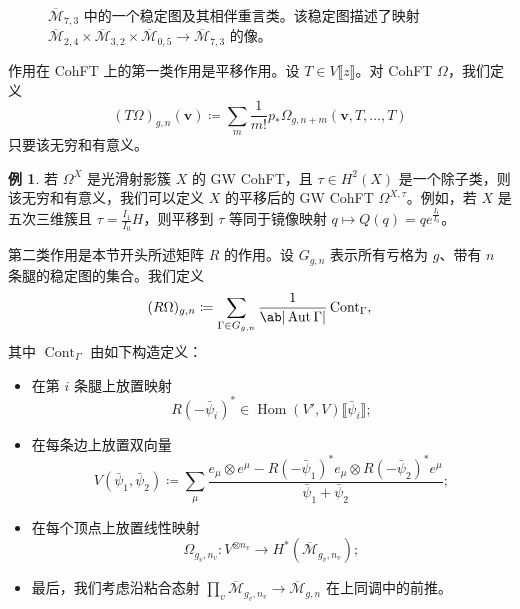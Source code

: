 \documentclass{amsart}
\theoremstyle{definition}
\newtheorem{exm}[thm]{例}
\theoremstyle{remark}
\theoremstyle{plain}
\theoremstyle{definition}
\theoremstyle{remark}
\newcommand{\Mbar}{\overline{\mathcal{M}}}
\newcommand{\mc}[1]{\mathcal{#1}}
\newcommand{\mbf}[1]{\mathbf{#1}}
\newcommand{\bv}{\mbf{v}}
\newcommand{\on}[1]{\operatorname{#1}}
\newcommand{\ol}[1]{\overline{#1}}
\newcommand{\1}{\mathbf{1}}
\newcommand{\2}{\mathbf{2}}
\newcommand{\3}{\mathbf{3}}
\newcommand{\ps}[1]{\llbracket #1 \rrbracket}
\DeclareMathOperator{\Hom}{Hom}
\DeclareMathOperator{\Aut}{Aut}
\begin{document}
\begin{figure}[htpb]
  \centering
  \caption{$\ol{\mc{M}}_{7,3}$ 中的一个稳定图及其相伴重言类。该稳定图描述了映射
    $\ol{\mc{M}}_{2,4} \times \ol{\mc{M}}_{3,2} \times \ol{\mc{M}}_{0,5} \to \ol{\mc{M}}_{7,3}$ 的像。}
  \label{fig:stablegraph}
\end{figure}

作用在 CohFT 上的第一类作用是平移作用。设 $T \in V\ps{z}$。对 CohFT $\Omega$，我们定义
\[ (T\Omega)_{g,n}(\bv) \coloneqq \sum_m \frac{1}{m!} p_* \Omega_{g,n+m}(\bv, T,\ldots,T) \]
只要该无穷和有意义。

\begin{exm}
    若 $\Omega^X$ 是光滑射影簇 $X$ 的 GW CohFT，且 $\tau \in H^2(X)$ 是一个除子类，则该无穷和有意义，我们可以定义 $X$ 的平移后的 GW CohFT $\Omega^{X,\tau}$。例如，若 $X$ 是五次三维簇且 $\tau = \frac{I_1}{I_0} H$，则平移到 $\tau$ 等同于镜像映射 $q \mapsto Q(q) = q e^{\frac{I_1}{I_0}}$。
\end{exm}

第二类作用是本节开头所述矩阵 $R$ 的作用。设 $G_{g,n}$ 表示所有亏格为 $g$、带有 $n$ 条腿的稳定图的集合。我们定义
\[ (R\Omega)_{g,n} \coloneqq \sum_{\Gamma \in G_{g,n}} \frac{1}{\ab|\Aut \Gamma|} \on{Cont}_{\Gamma}, \]
其中 $\on{Cont}_{\Gamma}$ 由如下构造定义：
\begin{itemize}
    \item 在第 $i$ 条腿上放置映射 
        \[ R(-\bar{\psi}_i)^* \in \Hom(V',V) \ps{\bar{\psi}_i}; \]
    \item 在每条边上放置双向量
        \[ V(\bar{\psi}_1, \bar{\psi}_2) \coloneqq \sum_{\mu} \frac{e_{\mu} \otimes e^{\mu} - R(-\bar{\psi}_1)^* e_{\mu} \otimes R(-\bar{\psi}_2)^* e^{\mu}}{\bar{\psi}_1 + \bar{\psi}_2}; \]
    \item 在每个顶点上放置线性映射
        \[ \Omega_{g_v, n_v} \colon V^{\otimes n_v} \to H^*(\Mbar_{g_v, n_v}); \]
    \item 最后，我们考虑沿粘合态射 $\prod_v \Mbar_{g_v, n_v} \to \Mbar_{g,n}$ 在上同调中的前推。
\end{itemize}
\end{document}
